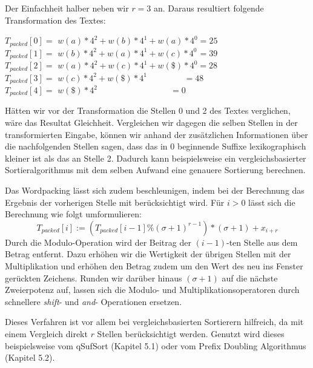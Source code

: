 Der Einfachheit halber neben wir $r=3$ an. Daraus resultiert folgende Transformation des Textes:
\begin{flushleft}
$T_{packed}[0]=$ $w(a)* 4^{2}+w(b)* 4^{1}+w(a)*4^{0}=25$\\
$T_{packed}[1]=$ $w(b)* 4^{2}+w(a)* 4^{1}+w(c)*4^{0}\hspace{1pt} =39$\\
$T_{packed}[2]=$ $w(a)* 4^{2}+w(c)* 4^{1}+w(\$)*4^{0}=28$\\
$T_{packed}[3]=$ $w(c)* 4^{2}+w(\$)*4^{1}\hspace{52pt} =48$\\
$T_{packed}[4]=$ $w(\$)* 4^{2}\hspace{103pt}=0$
\end{flushleft}
Hätten wir vor der Transformation die Stellen 0 und 2 des Textes verglichen,
wäre das Resultat Gleichheit. Vergleichen wir dagegen die selben Stellen in der transformierten Eingabe,
können wir anhand der zusätzlichen Informationen über die nachfolgenden Stellen sagen,
dass das in 0 beginnende Suffixe lexikographisch kleiner ist als das an Stelle 2.
Dadurch kann beispielsweise ein vergleichsbasierter Sortieralgorithmus mit dem selben Aufwand
eine genauere Sortierung berechnen.

Das Wordpacking lässt sich zudem beschleunigen, indem bei der Berechnung das Ergebnis
der vorherigen Stelle mit berücksichtigt wird. Für $i > 0$ lässt sich die Berechnung wie folgt umformulieren:
\begin{equation}
T_{packed}[i] := (T_{packed}[i-1] \% (\sigma+1)^{r-1})*(\sigma+1) + x_{i+r}
\end{equation}
Durch die Modulo-Operation wird der Beitrag der $(i-1)$-ten Stelle aus dem Betrag entfernt.
Dazu erhöhen wir die Wertigkeit der übrigen Stellen mit der Multiplikation und erhöhen den Betrag
zudem um den Wert des neu ins Fenster gerückten Zeichens.
Runden wir darüber hinaus $(\sigma+1)$ auf die nächste Zweierpotenz auf,
lassen sich die Modulo- und Multiplikationsoperatoren durch schnellere \textit{shift}- und \textit{and}- Operationen ersetzen.

Dieses Verfahren ist vor allem bei vergleichsbasierten Sortierern hilfreich,
da mit einem Vergleich direkt $r$ Stellen berücksichtigt werden.
Genutzt wird dieses beispielsweise vom qSufSort (Kapitel 5.1) oder
vom Prefix Doubling Algorithmus (Kapitel 5.2).
